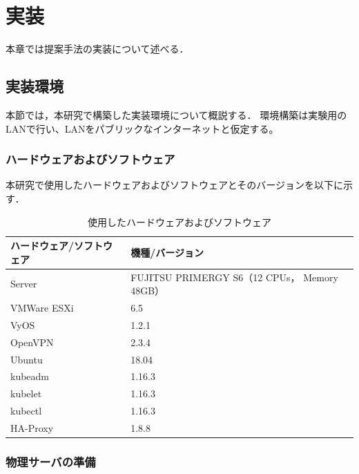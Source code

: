 \chapter{実装}
\label{implementation}

本章では提案手法の実装について述べる．

\section{実装環境}
\label{implementation:environment}

本節では，本研究で構築した実装環境について概説する．
環境構築は実験用のLANで行い、LANをパブリックなインターネットと仮定する。

\subsection{ハードウェアおよびソフトウェア}
\label{implementation:environment:resouces}

本研究で使用したハードウェアおよびソフトウェアとそのバージョンを以下に示す．

\begin{table}[htb]
  \begin{center}
    \caption{使用したハードウェアおよびソフトウェア}
    \begin{tabular}{|l|l|} \hline
      ハードウェア/ソフトウェア & 機種/バージョン \\ \hline
      Server & FUJITSU PRIMERGY S6（12 CPUs， Memory 48GB） \\ \hline
      VMWare ESXi & 6.5 \\ \hline
      VyOS & 1.2.1 \\ \hline
      OpenVPN & 2.3.4 \\ \hline
      Ubuntu & 18.04 \\ \hline
      kubeadm & 1.16.3 \\ \hline
      kubelet & 1.16.3 \\ \hline
      kubectl & 1.16.3 \\ \hline
      HA-Proxy & 1.8.8 \\ \hline
    \end{tabular}
  \end{center}
\end{table}

\subsection{物理サーバの準備}
\label{implementation:esxi}

